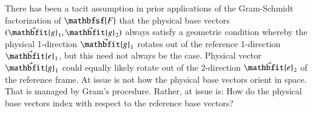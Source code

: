 There has been a tacit assumption in prior applications of the Gram-Schmidt factorization of $\mathbfsf{F}$ that the physical base vectors $( \vec{\mathbfit{g}}_{\hspace{0.5pt}1} , \vec{\mathbfit{g}}_{\hspace{0.5pt}2} )$ always satisfy a geometric condition whereby the physical 1-direction $\vec{\mathbfit{g}}_{\hspace{0.5pt}1}$ rotates out of the reference 1-direction $\vec{\mathbfit{e}}_{\hspace{0.5pt}1}$, but this need not always be the case.  Physical vector $\vec{\mathbfit{g}}_{\hspace{0.5pt}1}$ could equally likely rotate out of the 2-direction $\vec{\mathbfit{e}}_{\hspace{0.5pt}2}$ of the reference frame.  At issue is not how the physical base vectors orient in space.  That is managed by Gram's procedure.  Rather, at issue is: How do the physical base vectors index with respect to the reference base vectors?  

